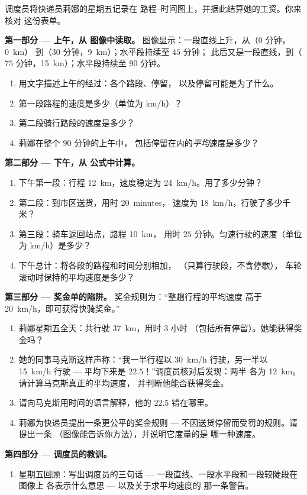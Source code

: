 \begin{problem}\label{pb:g7:motion-average-speed:1}
调度员将快递员莉娜的星期五记录在
路程–时间图上，并据此结算她的工资。你来核对
这份表单。

\medskip\noindent\textbf{第一部分 --- 上午，从
图像中读取。}
图像显示：一段直线上升，从（$0$ 分钟，\qty{0}{km}）
到（$30$ 分钟，\qty{9}{km}）；水平段持续至 $45$ 分钟；
此后又是一段直线，到（$75$ 分钟，\qty{15}{km}）；水平段持续至 $90$ 分钟。
\begin{enumerate}
  \item 用文字描述上午的经过：各个路段、停留，
        以及停留可能是为了什么。
  \item 第一段路程的速度是多少（单位为 \unit{km/h}）？
  \item 第二段骑行路段的速度是多少？
  \item 莉娜在整个 $90$ 分钟的上午中，
        包括停留在内的\emph{平均}速度是多少？
\end{enumerate}

\medskip\noindent\textbf{第二部分 --- 下午，从
公式中计算。}
\begin{enumerate}[resume]
  \item 下午第一段：行程 \qty{12}{km}，速度稳定为
        \qty{24}{km/h}。用了多少分钟？
  \item 第二段：到市区送货，用时 \qty{20}{minutes}，
        速度为 \qty{18}{km/h}，行驶了多少千米？
  \item 第三段：骑车返回站点，路程 \qty{10}{km}，
        用时 $25$ 分钟。匀速行驶的速度（单位为
        \unit{km/h}）是多少？
  \item 下午总计：将各段的路程和时间分别相加，
        （只算行驶段，不含停歇），
        车轮滚动时保持的平均速度是多少？
\end{enumerate}

\medskip\noindent\textbf{第三部分 --- 奖金单的陷阱。}
奖金规则为：“整趟行程的平均速度
高于 \qty{20}{km/h}，即可获得快骑奖金。”
\begin{enumerate}[resume]
  \item 莉娜星期五全天：共行驶 \qty{37}{km}，用时 $3$ 小时
        （包括所有停留）。她能获得奖金吗？
  \item 她的同事马克斯这样声称：“我一半行程以
        \qty{30}{km/h} 行驶，另一半以 \qty{15}{km/h} 行驶 ---
        平均下来是 $22.5$！”调度员核对后发现：两半
        各为 \qty{12}{km}。请计算马克斯真正的平均速度，
        并判断他能否获得奖金。
  \item 请向马克斯用时间的语言解释，他的 $22.5$
        错在哪里。
  \item 莉娜为快递员提出一条更公平的奖金规则 ---
        不因送货停留而受罚的规则。请提出一条
        （图像能告诉你方法），并说明它度量的是
        哪一种速度。
\end{enumerate}

\medskip\noindent\textbf{第四部分 --- 调度员的教训。}
\begin{enumerate}[resume]
  \item 星期五回顾：写出调度员的三句话 ---
        一段直线、一段水平段和一段较陡段在图像上
        各表示什么意思 ---
        以及关于求平均速度的
        那一条警告。
\end{enumerate}
\end{problem}
